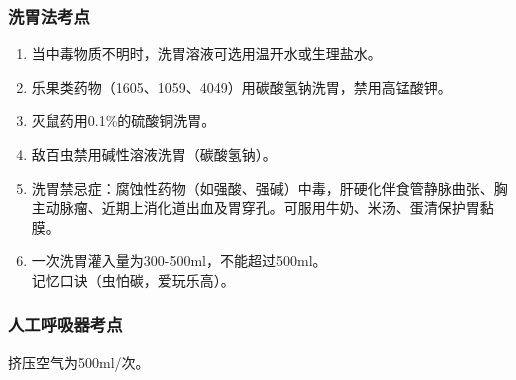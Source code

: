 \documentclass[11pt, a4paper]{ctexart}
\begin{document}
\subsubsection{洗胃法考点}
\begin{enumerate}
    \item 当中毒物质不明时，洗胃溶液可选用温开水或生理盐水。
    \item 乐果类药物（1605、1059、4049）用碳酸氢钠洗胃，禁用高锰酸钾。
    \item 灭鼠药用0.1\%的硫酸铜洗胃。
    \item 敌百虫禁用碱性溶液洗胃（碳酸氢钠）。
    \item 洗胃禁忌症：腐蚀性药物（如强酸、强碱）中毒，肝硬化伴食管静脉曲张、胸主动脉瘤、近期上消化道出血及胃穿孔。可服用牛奶、米汤、蛋清保护胃黏膜。
    \item 一次洗胃灌入量为300-500ml，不能超过500ml。\\
    记忆口诀（虫怕碳，爱玩乐高）。
\end{enumerate}

\subsubsection{人工呼吸器考点}
挤压空气为500ml/次。
\end{document}

